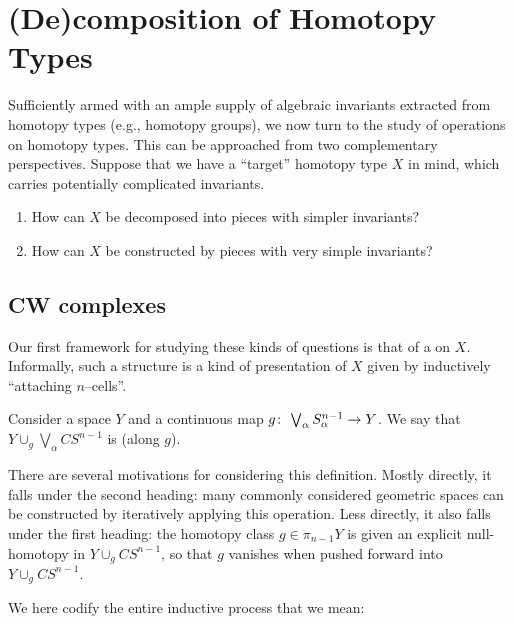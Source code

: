 
\chapter{(De)composition of Homotopy Types}


Sufficiently armed with an ample supply of algebraic invariants extracted from homotopy types (e.g., homotopy groups), we now turn to the study of operations on homotopy types.
This can be approached from two complementary perspectives.
Suppose that we have a ``target'' homotopy type $X$ in mind, which carries potentially complicated invariants.
\begin{enumerate}
    \item How can $X$ be decomposed into pieces with simpler invariants?
    \item How can $X$ be constructed by pieces with very simple invariants?
\end{enumerate}




\section{CW complexes}

Our first framework for studying these kinds of questions is that of a  on $X$.
Informally, such a structure is a kind of presentation of $X$ given by inductively ``attaching $n$--cells''.

\begin{definition}
Consider a space $Y$ and a continuous map $g\colon\thinspace \bigvee_\alpha S^{n-1}_\alpha \to Y$.
We say that $Y \cup_g \bigvee_\alpha CS^{n-1}$ is  (along $g$).
\end{definition}

\noindent
There are several motivations for considering this definition.
Mostly directly, it falls under the second heading: many commonly considered geometric spaces can be constructed by iteratively applying this operation.
Less directly, it also falls under the first heading: the homotopy class $g \in \pi_{n-1} Y$ is given an explicit null-homotopy in $Y \cup_g CS^{n-1}$, so that $g$ vanishes when pushed forward into $Y \cup_g CS^{n-1}$.

We here codify the entire inductive process that we mean:

